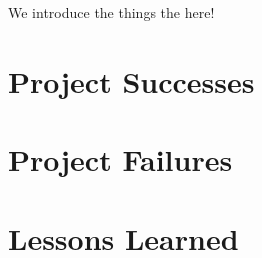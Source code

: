 We introduce the things the here!

\section{Project Successes}

\section{Project Failures}

\section{Lessons Learned}
